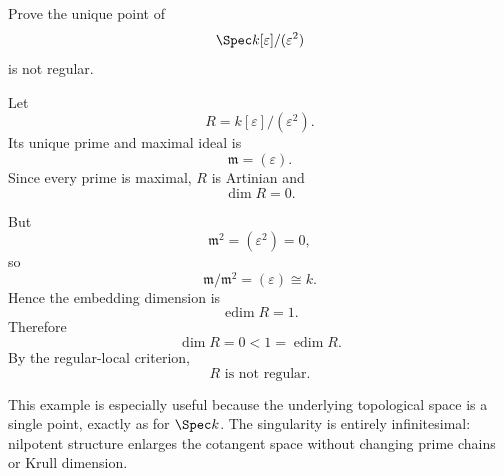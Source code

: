 \begin{problem}\label{prob:vi32-10}
Prove the unique point of
\[
\Spec k[\varepsilon]/(\varepsilon^2)
\]
is not regular.

\end{problem}

\ifdefined\FullProblemDossiers
\begin{solution}
Let
\[
R=k[\varepsilon]/(\varepsilon^2).
\]
Its unique prime and maximal ideal is
\[
\mathfrak m=(\varepsilon).
\]
Since every prime is maximal, \(R\) is Artinian and
\[
\dim R=0.
\]

But
\[
\mathfrak m^2=(\varepsilon^2)=0,
\]
so
\[
\mathfrak m/\mathfrak m^2
=
(\varepsilon)
\cong k.
\]
Hence the embedding dimension is
\[
\operatorname{edim}R=1.
\]
Therefore
\[
\dim R=0<1=\operatorname{edim}R.
\]
By the regular-local criterion,
\[
\boxed{R\text{ is not regular}.}
\]

This example is especially useful because the underlying topological space is a single point, exactly as for
\(\Spec k\). The singularity is entirely infinitesimal: nilpotent structure enlarges the cotangent space without
changing prime chains or Krull dimension.
\end{solution}
\fi
